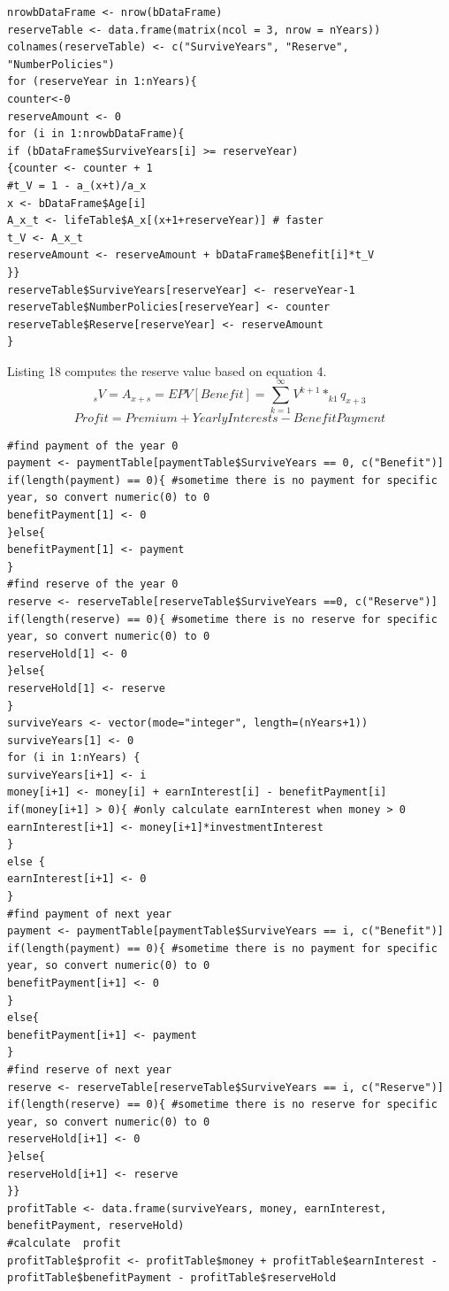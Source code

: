 \documentclass[12pt]{article}
\begin{document}
\begin{lstlisting}[caption={Calculating The Reserve Value },captionpos=b]
nrowbDataFrame <- nrow(bDataFrame)
reserveTable <- data.frame(matrix(ncol = 3, nrow = nYears))
colnames(reserveTable) <- c("SurviveYears", "Reserve", "NumberPolicies")
for (reserveYear in 1:nYears){
counter<-0
reserveAmount <- 0
for (i in 1:nrowbDataFrame){
if (bDataFrame$SurviveYears[i] >= reserveYear)
{counter <- counter + 1 
#t_V = 1 - a_(x+t)/a_x
x <- bDataFrame$Age[i]
A_x_t <- lifeTable$A_x[(x+1+reserveYear)] # faster
t_V <- A_x_t
reserveAmount <- reserveAmount + bDataFrame$Benefit[i]*t_V
}}
reserveTable$SurviveYears[reserveYear] <- reserveYear-1
reserveTable$NumberPolicies[reserveYear] <- counter
reserveTable$Reserve[reserveYear] <- reserveAmount
}
\end{lstlisting}
Listing 18 computes the reserve value based on equation 4.
\begin{equation}
_{s}V=A_{x+s}
     = EPV [Benefit]
     =\sum_{k=1}^{\infty}V^{k+1} * _{k1}q_{x+3}
\end{equation}
\begin{equation}
Profit= Premium + Yearly Interests - Benefit Payment
\end{equation}
\begin{lstlisting}[caption={Calculating The Annual Profit and The Reserve Value },captionpos=b]
#find payment of the year 0
payment <- paymentTable[paymentTable$SurviveYears == 0, c("Benefit")] 
if(length(payment) == 0){ #sometime there is no payment for specific year, so convert numeric(0) to 0
benefitPayment[1] <- 0
}else{
benefitPayment[1] <- payment
}
#find reserve of the year 0
reserve <- reserveTable[reserveTable$SurviveYears ==0, c("Reserve")]
if(length(reserve) == 0){ #sometime there is no reserve for specific year, so convert numeric(0) to 0
reserveHold[1] <- 0
}else{
reserveHold[1] <- reserve
}
surviveYears <- vector(mode="integer", length=(nYears+1))
surviveYears[1] <- 0
for (i in 1:nYears) {
surviveYears[i+1] <- i
money[i+1] <- money[i] + earnInterest[i] - benefitPayment[i] 
if(money[i+1] > 0){ #only calculate earnInterest when money > 0
earnInterest[i+1] <- money[i+1]*investmentInterest
}
else {
earnInterest[i+1] <- 0
}
#find payment of next year
payment <- paymentTable[paymentTable$SurviveYears == i, c("Benefit")] 
if(length(payment) == 0){ #sometime there is no payment for specific year, so convert numeric(0) to 0
benefitPayment[i+1] <- 0
}
else{
benefitPayment[i+1] <- payment
}
#find reserve of next year
reserve <- reserveTable[reserveTable$SurviveYears == i, c("Reserve")]
if(length(reserve) == 0){ #sometime there is no reserve for specific year, so convert numeric(0) to 0
reserveHold[i+1] <- 0
}else{
reserveHold[i+1] <- reserve
}} 
profitTable <- data.frame(surviveYears, money, earnInterest, benefitPayment, reserveHold)
#calculate  profit
profitTable$profit <- profitTable$money + profitTable$earnInterest - profitTable$benefitPayment - profitTable$reserveHold
\end{lstlisting}
\end{document}
